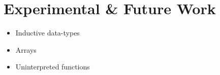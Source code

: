 \documentclass{llncs}
\begin{document}
\section{Experimental \& Future Work}

\begin{itemize}
\item Inductive data-types
\item Arrays
\item Uninterpreted functions
\end{itemize}

{}

\end{document}
